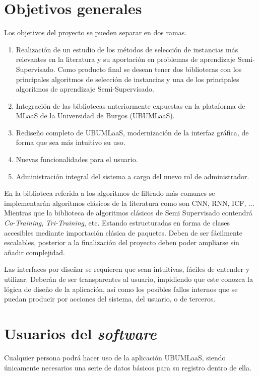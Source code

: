 \section{Objetivos generales}\label{objetivos-generales}
Los objetivos del proyecto se pueden separar en dos ramas.
\begin{enumerate}
\item Realización de un estudio de los métodos de selección de instancias más relevantes en la literatura y su aportación en problemas de aprendizaje Semi-Supervisado. Como producto final se desean tener dos bibliotecas con los principales algoritmos de selección de instancias y una de los principales algoritmos de aprendizaje Semi-Supervisado.
\item Integración de las bibliotecas anteriormente expuestas en la plataforma de MLaaS de la Universidad de Burgos (UBUMLaaS).
\item Rediseño completo de UBUMLaaS, modernización de la interfaz gráfica, de forma que sea más intuitivo su uso.
\item Nuevas funcionalidades para el usuario.
\item Administración integral del sistema a cargo del nuevo rol de administrador.
\end{enumerate}

En la biblioteca referida a los algoritmos de filtrado más comunes se implementarán algoritmos clásicos de la literatura como son CNN, RNN, ICF, ... Mientras que la biblioteca de algoritmos clásicos de Semi Supervisado contendrá \textit{Co-Training}, \textit{Tri-Training}, etc. Estando estructuradas en forma de clases accesibles mediante importación clásica de paquetes. Deben de ser fácilmente escalables, posterior a la finalización del proyecto deben poder ampliarse sin añadir complejidad.

Las interfaces por diseñar se requieren que sean intuitivas, fáciles de entender y utilizar. Deberán de ser transparentes al usuario, impidiendo que este conozca la lógica de diseño de la aplicación, así como los posibles fallos internos que se puedan producir por acciones del sistema, del usuario, o de terceros.


\section{Usuarios del \textit{software}}\label{usuarios-participantes-software}
Cualquier persona podrá hacer uso de la aplicación UBUMLaaS, siendo únicamente necesarios una serie de datos básicos para su registro dentro de ella. 


